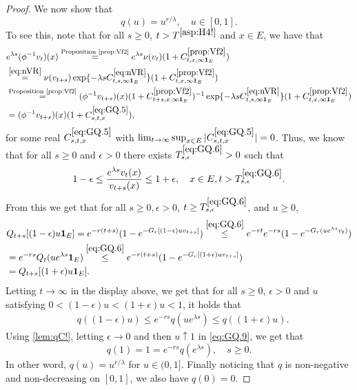 \documentclass[12pt,a4paper]{amsart}
\numberwithin{equation}{section}
\theoremstyle{plain}
\theoremstyle{definition}
\theoremstyle{remark}
\begin{document}
\begin{proof}
	We now show that
\begin{equation} \label{eq:GQ}
	q(u) = u^{r/\lambda},\quad u\in [0,1].
\end{equation}
	To see this, note that for all $s\geq 0$, $t>T^{\eqref{asp:H4!}}$ and $x\in E$, we have that
\begin{align}
	& e^{\lambda s}(\phi^{-1}v_t)(x)
	\overset{\text{Proposition \ref{prop:Vf2}}}= e^{\lambda s}\nu(v_{t})(1+ C^{\ref{prop:Vf2}}_{t,x,\infty \mathbf 1_E})
	\\&\overset{\eqref{eq:nVR}}=\nu(v_{t+s}) \exp\{-\lambda sC^{\eqref{eq:nVR}}_{t,s,\infty \mathbf 1_E}\} (1+ C^{\ref{prop:Vf2}}_{t,x,\infty \mathbf 1_E})
	\\&\overset{\text{Proposition \ref{prop:Vf2}}}= (\phi^{-1}v_{t+s})(x) (1+ C^{\ref{prop:Vf2}}_{t+s,x,\infty \mathbf 1_E})^{-1} \exp\{-\lambda sC^{\eqref{eq:nVR}}_{t,s,\infty \mathbf 1_E}\} (1+ C^{\ref{prop:Vf2}}_{t,x,\infty \mathbf 1_E})
	\\& \label{eq:GQ.5}= (\phi^{-1}v_{t+s})(x) (1+C_{s,t,x}^{\eqref{eq:GQ.5}}),
\end{align}
	for some real $C_{s,t,x}^{\eqref{eq:GQ.5}}$ with $\lim_{t\to \infty}\sup_{x\in E} |C_{s,t,x}^{\eqref{eq:GQ.5}}| =0$.
	Thus, we know that for all $s\geq 0$ and $\epsilon >0$ there exists $T^{\eqref{eq:GQ.6}}_{s,\epsilon}>0$ such that
\begin{equation} \label{eq:GQ.6}
	1-\epsilon
	\leq \frac{e^{\lambda s}v_t(x)}{v_{t+s}(x)}
	\leq 1+\epsilon,
	\quad x\in E, t> T^{\eqref{eq:GQ.6}}_{s,\epsilon}.
\end{equation}
	From this we get that for all $s\geq 0, \epsilon > 0$, $t\ge T^{\eqref{eq:GQ.6}}_{s,\epsilon}$, and $u\geq 0$,
\begin{align}
	& Q_{t+s}[ (1-\epsilon)u \mathbf 1_E ]
	= e^{-r (t+s)}( 1-e^{-G_r[(1-\epsilon)uv_{t+s}]} )
	\overset{\eqref{eq:GQ.6}}\leq e^{-r t} e^{-r s}( 1- e^{-G_r(ue^{\lambda s}v_t)} )
	\\&= e^{-r s}Q_t(ue^{\lambda s} \mathbf 1_E)
	\overset{\eqref{eq:GQ.6}}\leq e^{-r(t+s)}( 1-e^{-G_r[(1+\epsilon)uv_{t+s}]})
	\\&= Q_{t+s}[ (1+\epsilon)u \mathbf 1_E ].
\end{align}
	Letting $t\to \infty$ in the display above, we get that for all $s\geq 0$, $\epsilon > 0$ and $u$ satisfying $0 < (1 - \epsilon) u < (1+\epsilon)u < 1$, it holds that
\begin{align} \label{eq:GQ.9}
	& q((1-\epsilon)u)
	\leq e^{-r s}q(u e^{\lambda s})
	\leq q((1+\epsilon)u).
\end{align}
	Using \eqref{lem:qC!}, letting $\epsilon \to 0$ and then $u \uparrow 1$ in \eqref{eq:GQ.9}, we get that
\[
	q(1)
	=1
	= e^{- r s} q(e^{\lambda s}),
	\quad s \geq 0.
\]
	In other word, $q(u) = u^{r/\lambda}$ for $u\in (0,1]$.
	Finally noticing that $q$ is non-negative and non-decreasing on $[0,1]$, we also have $q(0) = 0$.


\end{proof}
\end{document}
